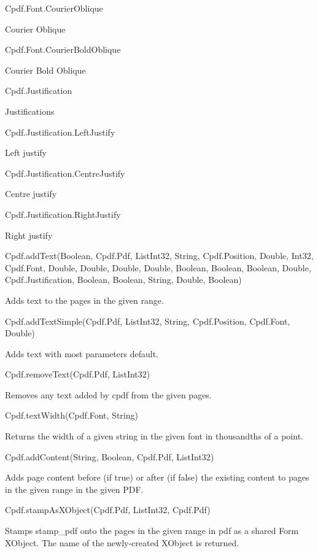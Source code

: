 Cpdf.Font.CourierOblique

Courier Oblique

Cpdf.Font.CourierBoldOblique

Courier Bold Oblique

Cpdf.Justification

Justifications

Cpdf.Justification.LeftJustify

Left justify

Cpdf.Justification.CentreJustify

Centre justify

Cpdf.Justification.RightJustify

Right justify

Cpdf.addText(Boolean, Cpdf.Pdf, List{Int32}, String, Cpdf.Position, Double,
Int32, Cpdf.Font, Double, Double, Double, Double, Boolean, Boolean, Boolean,
Double, Cpdf.Justification, Boolean, Boolean, String, Double, Boolean)

Adds text to the pages in the given range.

Cpdf.addTextSimple(Cpdf.Pdf, List{Int32}, String, Cpdf.Position, Cpdf.Font,
Double)

Adds text with most parameters default.

Cpdf.removeText(Cpdf.Pdf, List{Int32})

Removes any text added by cpdf from the given pages.

Cpdf.textWidth(Cpdf.Font, String)

Returns the width of a given string in the given font in thousandths of a
point.

Cpdf.addContent(String, Boolean, Cpdf.Pdf, List{Int32})

Adds page content before (if true) or after (if false) the existing content to
pages in the given range in the given PDF.

Cpdf.stampAsXObject(Cpdf.Pdf, List{Int32}, Cpdf.Pdf)

Stamps stamp_pdf onto the pages in the given range in pdf as a shared Form
XObject. The name of the newly-created XObject is returned.
